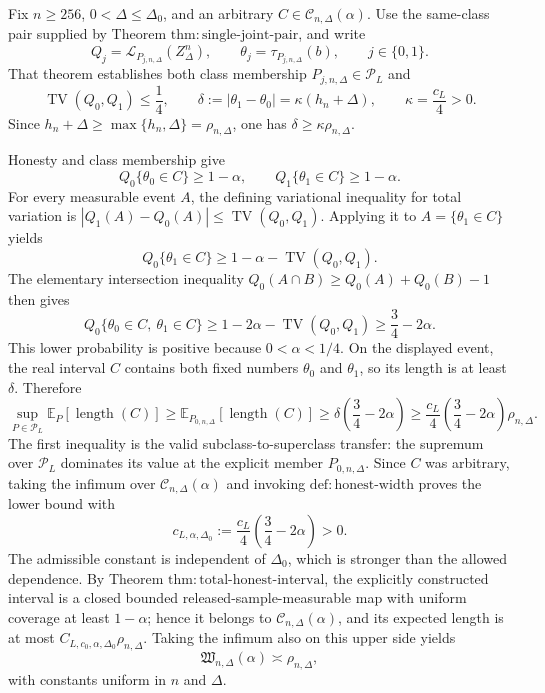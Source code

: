 Fix \(n\geq256\), \(0<\Delta\leq\Delta_0\), and an arbitrary \(C\in\mathcal C_{n,\Delta}(\alpha)\).  Use the same-class pair supplied by Theorem \(\mathrm{thm:single\text{-}joint\text{-}pair}\), and write
\[
 Q_j=\mathcal L_{P_{j,n,\Delta}}(Z_\Delta^n),
 \qquad
 \theta_j=\tau_{P_{j,n,\Delta}}(b),
 \qquad j\in\{0,1\}.
\]
That theorem establishes both class membership \(P_{j,n,\Delta}\in\mathcal P_L\) and
\[
 \operatorname{TV}(Q_0,Q_1)\leq\frac14,
 \qquad
 \delta:=|\theta_1-\theta_0|
 =\kappa(h_n+\Delta),
 \qquad
 \kappa=\frac{c_L}{4}>0.
\]
Since \(h_n+\Delta\geq\max\{h_n,\Delta\}=\rho_{n,\Delta}\), one has \(\delta\geq\kappa\rho_{n,\Delta}\).

Honesty and class membership give
\[
 Q_0\{\theta_0\in C\}\geq1-\alpha,
 \qquad
 Q_1\{\theta_1\in C\}\geq1-\alpha.
\]
For every measurable event \(A\), the defining variational inequality for total variation is \(|Q_1(A)-Q_0(A)|\leq\operatorname{TV}(Q_0,Q_1)\).  Applying it to \(A=\{\theta_1\in C\}\) yields
\[
 Q_0\{\theta_1\in C\}
 \geq1-\alpha-\operatorname{TV}(Q_0,Q_1).
\]
The elementary intersection inequality \(Q_0(A\cap B)\geq Q_0(A)+Q_0(B)-1\) then gives
\[
 Q_0\{\theta_0\in C,\ \theta_1\in C\}
 \geq1-2\alpha-\operatorname{TV}(Q_0,Q_1)
 \geq\frac34-2\alpha.
\]
This lower probability is positive because \(0<\alpha<1/4\).  On the displayed event, the real interval \(C\) contains both fixed numbers \(\theta_0\) and \(\theta_1\), so its length is at least \(\delta\).  Therefore
\[
 \sup_{P\in\mathcal P_L}\mathbb E_P[\operatorname{length}(C)]
 \geq\mathbb E_{P_{0,n,\Delta}}[\operatorname{length}(C)]
 \geq\delta\left(\frac34-2\alpha\right)
 \geq\frac{c_L}{4}\left(\frac34-2\alpha\right)\rho_{n,\Delta}.
\]
The first inequality is the valid subclass-to-superclass transfer: the supremum over \(\mathcal P_L\) dominates its value at the explicit member \(P_{0,n,\Delta}\).  Since \(C\) was arbitrary, taking the infimum over \(\mathcal C_{n,\Delta}(\alpha)\) and invoking \(\mathrm{def:honest\text{-}width}\) proves the lower bound with
\[
 c_{L,\alpha,\Delta_0}
 :=\frac{c_L}{4}\left(\frac34-2\alpha\right)>0.
\]
The admissible constant is independent of \(\Delta_0\), which is stronger than the allowed dependence.  By Theorem \(\mathrm{thm:total\text{-}honest\text{-}interval}\), the explicitly constructed interval is a closed bounded released-sample-measurable map with uniform coverage at least \(1-\alpha\); hence it belongs to \(\mathcal C_{n,\Delta}(\alpha)\), and its expected length is at most \(C_{L,c_0,\alpha,\Delta_0}\rho_{n,\Delta}\).  Taking the infimum also on this upper side yields
\[
 \mathfrak W_{n,\Delta}(\alpha)\asymp\rho_{n,\Delta},
\]
with constants uniform in \(n\) and \(\Delta\).